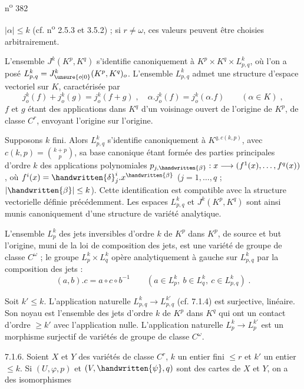 \hfill n\textsuperscript{o} 382

$|\alpha|\leq k$ (cf. n\textsuperscript{o} 2.5.3 et 3.5.2) ; si $r\ne\omega$, ces valeurs peuvent être choisies arbitrairement.

L'ensemble $J^k(K^p,K^q)$ s'identifie canoniquement à $K^p\times K^q\times L^k_{p,q}$, où l'on a posé $L^k_{p,q}=J^k_{\unsure{o|0}}(K^p,K^q)_o$. L'ensemble $L^k_{p,q}$ admet une structure d'espace vectoriel sur $K$, caractérisée par
\[
j^k_o(f)+j^k_o(g)=j^k_o(f+g)\;,\quad\alpha.j^k_o(f)=j^k_o(\alpha.f)\qquad(\alpha\in K)\;,
\]
$f$ et $g$ étant des applications dans $K^q$ d'un voisinage ouvert de l'origine de $K^p$, de classe $C^r$, envoyant l'origine sur l'origine.

Supposons $k$ fini. Alors $L^k_{p,q}$ s'identifie canoniquement à $K^{q,c(k,p)}$, avec $c(k,p)=\binom{k+p}{p}$, sa base canonique étant formée des parties principales d'ordre $k$ des applications polynomiales $p_{j,\handwritten{\beta}}:x\longrightarrow(f^1(x),\ldots,f^q(x))$, où $f^i(x)=\handwritten{\delta}^i_j.x^{\handwritten{\beta}}$ ($j=1,\ldots,q$ ; $|\handwritten{\beta}|\leq k$). Cette identification est compatible avec la structure vectorielle définie précédemment. Les espaces $L^k_{p,q}$ et $J^k(K^p,K^q)$ sont ainsi munis canoniquement d'une structure de variété analytique.

L'ensemble $L^k_p$ des jets inversibles d'ordre $k$ de $K^p$ dans $K^p$, de source et but l'origine, muni de la loi de composition des jets, est une variété de groupe de classe $C^\omega$ ; le groupe $L^k_p\times L^k_q$ opère analytiquement à gauche sur $L^k_{p,q}$ par la composition des jets :
\[
(a,b).c=a\circ c\circ b^{-1}\qquad (a\in L^k_p,\ b\in L^k_q,\ c\in L^k_{p,q})\;.
\]

Soit $k'\leq k$. L'application naturelle $L^k_{p,q}\longrightarrow L^{k'}_{p,q}$ (cf. 7.1.4) est surjective, linéaire. Son noyau est l'ensemble des jets d'ordre $k$ de $K^p$ dans $K^q$ qui ont un contact d'ordre $\geq k'$ avec l'application nulle. L'application naturelle $L^k_p\longrightarrow L^{k'}_p$ est un morphisme surjectif de variétés de groupe de classe $C^\omega$.

7.1.6. Soient $X$ et $Y$ des variétés de classe $C^r$, $k$ un entier fini $\leq r$ et $k'$ un entier $\leq k$. Si $(U,\varphi,p)$ et $(V,\handwritten{\psi},q)$ sont des cartes de $X$ et $Y$, on a des isomorphismes
